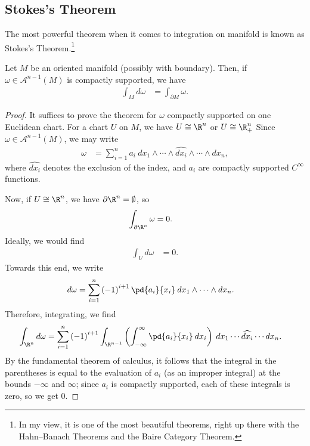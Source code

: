 \documentclass[10pt]{mypackage}
\begin{document}
\subsection{Stokes's Theorem}%
The most powerful theorem when it comes to integration on manifold is known as Stokes's Theorem.\footnote{In my view, it is one of the most beautiful theorems, right up there with the Hahn--Banach Theorems and the Baire Category Theorem.}
\begin{theorem}
  Let $M$ be an oriented manifold (possibly with boundary). Then, if $\omega\in \mathcal{A}^{n-1}\left( M \right)$ is compactly supported, we have
  \begin{align*}
    \int_{M}^{} d\omega &= \int_{\partial M}^{} \omega.
  \end{align*}
\end{theorem}
\begin{proof}
  It suffices to prove the theorem for $\omega$ compactly supported on one Euclidean chart. For a chart $U$ on $M$, we have $U\cong \R^{n}$ or $U\cong \R^{n}_{+}$ Since $\omega\in \mathcal{A}^{n-1}\left( M \right)$, we may write
  \begin{align*}
    \omega &= \sum_{i=1}^{n} a_i\:dx_1\wedge\cdots\wedge \widehat{dx_i}\wedge\cdots\wedge dx_n,
  \end{align*}
  where $\widehat{dx_i}$ denotes the exclusion of the index, and $a_i$ are compactly supported $C^{\infty}$ functions.\newline

  Now, if $U \cong \R^{n}$, we have $\partial \R^{n} = \emptyset$, so
  \begin{align*}
    \int_{\partial \R^{n}}^{}\omega &= 0.
  \end{align*}
  Ideally, we would find
  \begin{align*}
    \int_{U}^{}d\omega &= 0.
  \end{align*}
  Towards this end, we write
  \begin{align*}
    d\omega &= \sum_{i=1}^{n} \left( -1 \right)^{i+1} \pd{a_i}{x_i}\:dx_1\wedge\cdots\wedge dx_n.
  \end{align*}
  Therefore, integrating, we find
  \begin{align*}
    \int_{\R^{n}}^{}d\omega &= \sum_{i=1}^{n} \left( -1 \right)^{i+1}\int_{\R^{n-1}}^{} \left( \int_{-\infty}^{\infty} \pd{a_i}{x_i}\:dx_i \right)\:dx_1\cdots \widehat{dx_i}\cdots dx_n.
  \end{align*}
  By the fundamental theorem of calculus, it follows that the integral in the parentheses is equal to the evaluation of $a_i$ (as an improper integral) at the bounds $-\infty$ and $\infty$; since $a_i$ is compactly supported, each of these integrals is zero, so we get $0$.\newline


\end{proof}
\end{document}
